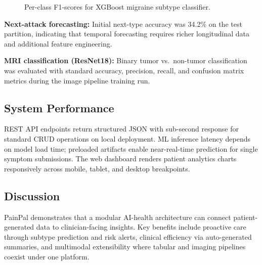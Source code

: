 \documentclass[conference,twocolumn,letterpaper]{IEEEtran}
\begin{document}
\begin{figure}[!t]
\centering
{}
\caption{Per-class F1-scores for XGBoost migraine subtype classifier.}
\label{fig:f1chart}
\end{figure}

\textbf{Next-attack forecasting:} Initial next-type accuracy was 34.2\% on the test partition, indicating that temporal forecasting requires richer longitudinal data and additional feature engineering.

\textbf{MRI classification (ResNet18):} Binary tumor vs.\ non-tumor classification was evaluated with standard accuracy, precision, recall, and confusion matrix metrics during the image pipeline training run.

\subsection{System Performance}
REST API endpoints return structured JSON with sub-second response for standard CRUD operations on local deployment. ML inference latency depends on model load time; preloaded artifacts enable near-real-time prediction for single symptom submissions. The web dashboard renders patient analytics charts responsively across mobile, tablet, and desktop breakpoints.

\subsection{Discussion}
PainPal demonstrates that a modular AI-health architecture can connect patient-generated data to clinician-facing insights. Key benefits include proactive care through subtype prediction and risk alerts, clinical efficiency via auto-generated summaries, and multimodal extensibility where tabular and imaging pipelines coexist under one platform.
\end{document}
